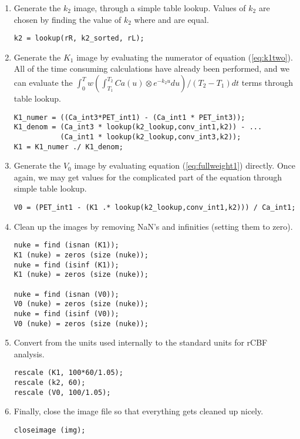 \begin{enumerate}
\item Generate the $k_2$ image, through a simple table lookup.
Values of $k_2$ are chosen by finding the value of $k_2$ where
 and  are equal.
\begin{verbatim}
k2 = lookup(rR, k2_sorted, rL);
\end{verbatim}

\item Generate the $K_1$ image by evaluating the numerator of
equation (\ref{eq:k1two}).  All of the time consuming calculations
have already been performed, and we can evaluate the $\int_{0}^{T} w
(\int_{T_1}^{T_2} Ca(u) \otimes e^{-k_{2}u} du)/(T_2 - T_1) dt$ terms
through table lookup.
\begin{verbatim}
K1_numer = ((Ca_int3*PET_int1) - (Ca_int1 * PET_int3));
K1_denom = (Ca_int3 * lookup(k2_lookup,conv_int1,k2)) - ...
           (Ca_int1 * lookup(k2_lookup,conv_int3,k2));
K1 = K1_numer ./ K1_denom;
\end{verbatim}

\item Generate the $V_0$ image by evaluating equation
(\ref{eq:fullweight1}) directly.  Once again, we may get values for
the complicated part of the equation through simple table lookup.
\begin{verbatim}
V0 = (PET_int1 - (K1 .* lookup(k2_lookup,conv_int1,k2))) / Ca_int1;
\end{verbatim}

\item Clean up the images by removing NaN's and infinities (setting
them to zero).
\begin{verbatim}
nuke = find (isnan (K1));
K1 (nuke) = zeros (size (nuke));
nuke = find (isinf (K1));
K1 (nuke) = zeros (size (nuke));

nuke = find (isnan (V0));
V0 (nuke) = zeros (size (nuke));
nuke = find (isinf (V0));
V0 (nuke) = zeros (size (nuke));
\end{verbatim}

\item Convert from the units used internally to the standard units for
  rCBF analysis.
  \begin{verbatim}
rescale (K1, 100*60/1.05);
rescale (k2, 60);
rescale (V0, 100/1.05);
  \end{verbatim}

\item Finally, close the image file so that everything gets cleaned
up nicely.
\begin{verbatim}
closeimage (img);
\end{verbatim}

\end{enumerate}



